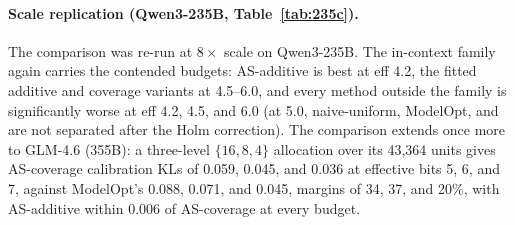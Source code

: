 \paragraph{Scale replication (Qwen3-235B, Table~\ref{tab:235c}).} The comparison was re-run at
$8\times$ scale on Qwen3-235B. The in-context family again carries the contended budgets: AS-additive
is best at eff 4.2, the fitted additive and coverage variants at 4.5--6.0, and every method outside
the family is significantly worse at eff 4.2, 4.5, and 6.0 (at 5.0, naive-uniform, ModelOpt, and
 are not separated after the Holm correction). 
The comparison extends once more
to
GLM-4.6 (355B): a three-level $\{16,8,4\}$ allocation over its 43{,}364 units gives AS-coverage
calibration KLs of 0.059, 0.045, and 0.036 at effective bits 5, 6, and 7, against ModelOpt's 0.088,
0.071, and 0.045, margins of 34, 37, and 20\%, with AS-additive within 0.006 of AS-coverage at
every budget. 

\begin{table}[t]
\centering
\caption{Qwen3-235B, all methods measured jointly on the task-aligned corpus of
App.~\ref{app:setup}, with paired significance vs.\ AS-additive over the 16 shared sequences
($*$ = significant after Holm correction within each budget row at the 5\% level).}
\label{tab:235c}
\end{table}



